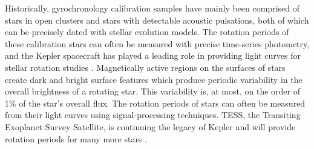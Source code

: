 Historically, gyrochronology calibration samples have mainly been comprised of
stars in open clusters and stars with detectable acoustic pulsations, both of
which can be precisely dated with stellar evolution models.
The rotation periods of these calibration stars can often be measured with
precise time-series photometry, and the Kepler spacecraft has played a leading
role in providing light curves for stellar rotation studies
\citep[\eg][]{borucki2010, meibom2011, mcquillan2013, mcquillan2014,
howell2014, reinhold2014, garcia2014, aigrain2015, meibom2015, douglas2016,
douglas2017, rebull2016, rebull2017, santos2019, reinhold2019, rebull2020,
gordon2020, curtis2020, breton2021}.
Magnetically active regions on the surfaces of stars create dark and bright
surface features which produce periodic variability in the overall brightness
of a rotating star.
This variability is, at most, on the order of 1\% of the star's overall flux.
The rotation periods of stars can often be measured from their light curves
using signal-processing techniques.
TESS, the Transiting Exoplanet Survey Satellite, is continuing the legacy of
Kepler and will provide rotation periods for many more stars
\citep{ricker2014}.


